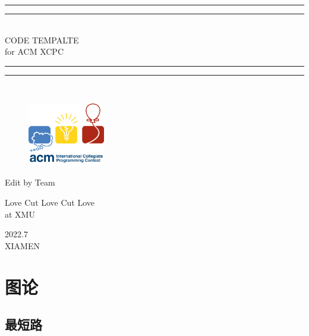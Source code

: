 \documentclass[a4paper,11pt,twoside,fontset = fandol,UTF8]{ctexbook}
\newcommand{\emptyPage}{\null\thispagestyle{empty}\addtocounter{page}{-1}\newpage}
\begin{document}
  \begin{titlepage}       %
    \centering
    \vspace*{\baselineskip}
    \rule{\textwidth}{1.6pt}
    \vspace*{-\baselineskip}
    \vspace*{2pt}
    \rule{\textwidth}{0.4pt}\\[\baselineskip]{\LARGE CODE TEMPALTE\\[\baselineskip]\small for ACM XCPC}
    \\[0.2\baselineskip]
    \rule{\textwidth}{0.4pt}\vspace*{-\baselineskip}\vspace{3.2pt}
    \rule{\textwidth}{1.6pt}\\[\baselineskip]
    \scshape

    \begin{figure}[!htb]
        \centering
        \includegraphics[width=0.3\textwidth]{icpc}    %
    \end{figure}

    \vspace*{3\baselineskip}
    Edit by Team\\
    [\baselineskip]
    {\Large {}  \par}
    {\Large Love Cut Love Cut Love \\ \normalsize{at XMU}\par}
    \vfill
    {\scshape 2022.7}\\{\large XIAMEN}\par
  \end{titlepage}

  \emptyPage

  \setcounter{page}{1}
  \tableofcontents

  \newpage
  \setcounter{page}{1}

  \chapter{图论}
  \setcounter{page}{1}
  \section{最短路}
\end{document}
